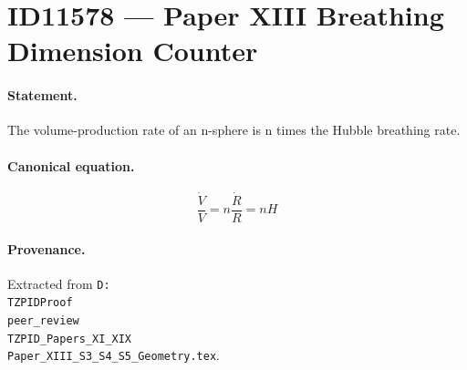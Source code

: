 \section*{ID11578 --- Paper XIII Breathing Dimension Counter}

\paragraph{Statement.}
The volume-production rate of an n-sphere is n times the Hubble breathing rate.

\paragraph{Canonical equation.}
\[
\frac{\dot V}{V}=n\frac{\dot R}{R}=nH
\]

\paragraph{Provenance.}
Extracted from \texttt{D:\\TZPIDProof\\peer\_review\\TZPID\_Papers\_XI\_XIX\\Paper\_XIII\_S3\_S4\_S5\_Geometry.tex}.
